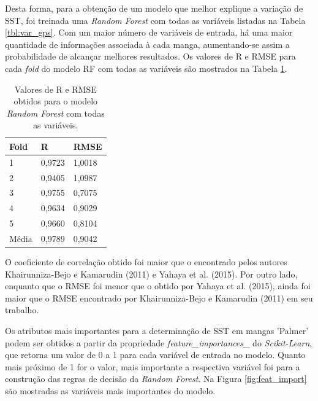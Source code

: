 Desta forma, para a obtenção de um modelo que melhor explique a variação de SST, foi treinada uma \textit{Random Forest} com todas as variáveis listadas na Tabela \ref{tbl:var_gps}. Com um maior número de variáveis de entrada, há uma maior quantidade de informações associada à cada manga, aumentando-se assim a probabilidade de alcançar melhores resultados. Os valores de R e RMSE para cada \textit{fold} do modelo RF com todas as variáveis são mostrados na Tabela \ref{tbl:r_rmse_all}.

\begin{table}[H]
	\centering
	\caption{\label{tbl:r_rmse_all} Valores de R e RMSE obtidos para o modelo \textit{Random Forest} com todas as variáveis.}
	\begin{tabular}{lll}
	\hline
	Fold  & R      & RMSE   \\ \hline
	1     & 0,9723 & 1,0018 \\ \hline
	2     & 0,9405 & 1,0987 \\ \hline
	3     & 0,9755 & 0,7075 \\ \hline
	4     & 0,9634 & 0,9029 \\ \hline
	5     & 0,9660 & 0,8104 \\ \hline
	Média & 0,9789 & 0,9042	\\ \hline
	\end{tabular}
\end{table}

O coeficiente de correlação obtido foi maior que o encontrado pelos autores Khairunniza-Bejo e Kamarudin (2011) e Yahaya et al. (2015). Por outro lado, enquanto que o RMSE foi menor que o obtido por Yahaya et al. (2015), ainda foi maior que o RMSE encontrado por Khairunniza-Bejo e Kamarudin (2011) em seu trabalho.

Os atributos mais importantes para a determinação de SST em mangas 'Palmer' podem ser obtidos a partir da propriedade \textit{feature\_importances\_} do \textit{Scikit-Learn}, que retorna um valor de 0 a 1 para cada variável de entrada no modelo. Quanto mais próximo de 1 for o valor, mais importante a respectiva variável foi para a construção das regras de decisão da \textit{Random Forest}. Na Figura \ref{fig:feat_import} são mostradas as variáveis mais importantes do modelo.


